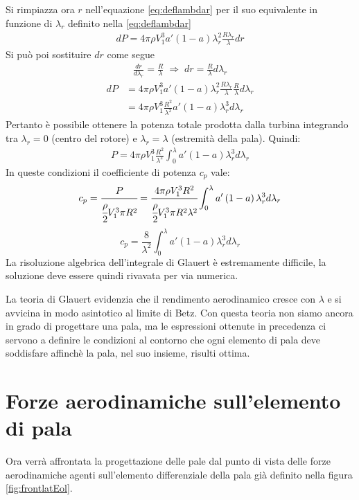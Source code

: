 Si rimpiazza ora $r$ nell'equazione \ref{eq:deflambdar} per il suo equivalente in funzione di $\lambda_r$ definito nella \ref{eq:deflambdar}
\begin{align*}
dP = 4 \pi \rho V_1^3 a' \left( 1 - a \right) \lambda_r^2 \frac{R \lambda_r}{\lambda} dr
\end{align*}
Si può poi sostituire $dr$ come segue
\begin{align*}
\frac{dr}{d \lambda_r} = \frac{R}{\lambda} \; \Rightarrow \; dr = \frac{R}{\lambda} d \lambda_r
\end{align*}
\begin{align*}
dP &= 4 \pi \rho V_1^3 a' \left(1 - a \right) \lambda_r^2 \frac{R \lambda_r}{\lambda} \frac{R}{\lambda} d \lambda_r\\
&= 4 \pi \rho V_1^3 \frac{R^2}{\lambda^2} a' \left( 1 - a \right) \lambda_r^3 d\lambda_r
\end{align*}
Pertanto è possibile ottenere la potenza totale prodotta dalla turbina integrando tra $\lambda_r = 0$ (centro del rotore) e $\lambda_r = \lambda$ (estremità della pala). Quindi:
\begin{align*}
P = 4 \pi \rho V_1^3 \frac{R^2}{\lambda^2} \int_0^{\lambda} a' \left( 1 - a \right) \lambda_r^3 d \lambda_r
\end{align*}
In queste condizioni il coefficiente di potenza $c_p$ vale:
\begin{align*}
c_p = \cfrac{P}{\cfrac{\rho}{2} V_1^3 \pi R^2} = \cfrac{4 \pi \rho V_1^3 R^2}{\cfrac{\rho}{2} V_1^3 \pi R^2 \lambda^2} \int_0^{\lambda} a' \left(1 - a \right) \lambda_r^3 d \lambda_r
\end{align*}
\begin{equation}
c_p = \frac{8}{\lambda^2} \int_0^{\lambda} a' \left( 1 - a \right) \lambda_r^3 d \lambda_r
\end{equation}
La risoluzione algebrica dell'integrale di Glauert è estremamente difficile, la soluzione deve essere quindi rivavata per via numerica.

La teoria di Glauert evidenzia che il rendimento aerodinamico cresce con $\lambda$ e si avvicina in modo asintotico al limite di Betz. Con questa teoria non siamo ancora in grado di progettare una pala, ma le espressioni ottenute in precedenza ci servono a definire le condizioni al contorno che ogni elemento di pala deve soddisfare affinchè la pala, nel suo insieme, risulti ottima.

\section{Forze aerodinamiche sull'elemento di pala}
Ora verrà affrontata la progettazione delle pale dal punto di vista delle forze aerodinamiche agenti sull'elemento differenziale della pala già definito nella figura \ref{fig:frontlatEol}. 

